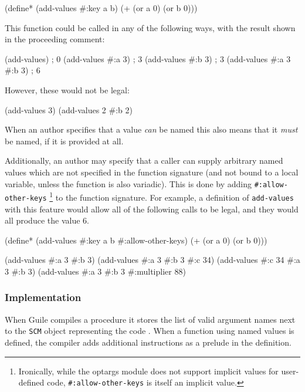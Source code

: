 \begin{pygmented}[lang=lisp]
(define* (add-values #:key a b)
  (+ (or a 0) (or b 0)))
\end{pygmented}

This function could be called in any of the following ways, with the result shown in the
proceeding comment:

\begin{pygmented}[lang=lisp]
(add-values)             ; 0
(add-values #:a 3)       ; 3
(add-values #:b 3)       ; 3
(add-values #:a 3 #:b 3) ; 6
\end{pygmented}

However, these would not be legal:

\begin{pygmented}[lang=lisp]
(add-values 3)
(add-values 2 #:b 2)
\end{pygmented}

When an author specifies that a value \textit{can} be named this also means that it
\textit{must} be named, if it is provided at all.

Additionally, an author may specify that a caller can supply arbitrary named values which
are not specified in the function signature (and not bound to a local variable, unless
the function is also variadic).
This is done by adding \texttt{\#:allow-other-keys}
\footnote{
	Ironically, while the optargs module does not support implicit values for user-defined
	code, \texttt{\#:allow-other-keys} is itself an implicit value.
}
to the function signature.
For example, a definition of \texttt{add-values} with this feature would allow all of
the following calls to be legal, and they would all produce the value 6.

\begin{pygmented}[lang=lisp]
(define* (add-values #:key a b #:allow-other-keys)
  (+ (or a 0) (or b 0)))

(add-values #:a 3 #:b 3)
(add-values #:a 3 #:b 3 #:c 34)
(add-values #:c 34 #:a 3 #:b 3)
(add-values #:a 3 #:b 3 #:multiplier 88)
\end{pygmented}

\subsubsection{Implementation}

When Guile compiles a procedure it stores the list of valid argument names next to the
\texttt{SCM} object representing the code
\parencite[][libguile/vm-engine.c lines 734, 736, 743-745;
             libbugile/vm.c       lines 1003, 1008-1009]{guile-source}.
When a function using named values is defined, the compiler adds additional instructions
as a prelude in the definition.


